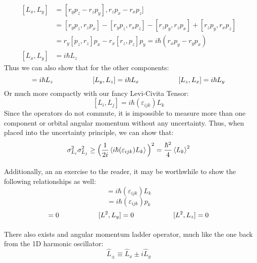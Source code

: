\documentclass[12pt,letterpaper]{book}
\begin{document}
\begin{equation}
\begin{split}
[L_x,L_y] &= [r_y p_z - r_z p_y], r_z p_x - r_x p_z] \\
			&= 	[r_y p_z,r_z p_x] - [r_y p_z, r_x p_z] - [r_z p_y,r_z p_x] + [r_z p_y,r_x p_z] \\
			&= 	r_y[p_z,r_z]p_x - r_x[r_z,p_z]p_y = i\hbar (r_x p_y - r_y p_x) \\
[L_x,L_y] &= i\hbar L_z	
\end{split}
\end{equation}
Thus we can also show that for the other components:
\begin{equation}
[L_x,L_y] = i\hbar L_z	\text{\hspace{2cm}}
[L_y,L_z] = i\hbar L_x	\text{\hspace{2cm}}
[L_z,L_x] = i\hbar L_y	
\end{equation}
Or much more compactly with our fancy Levi-Civita Tensor:
\begin{equation}
\label{L comm}
[L_i,L_j] = i\hbar(\varepsilon_{ijk})L_k
\end{equation}
Since the operators do not commute, it is impossible to measure more than one component or orbital angular momentum without any uncertainty. Thus, when placed into the uncertainty principle, we can show that:
\begin{equation}
\sigma^2_{L_i} \sigma^2_{L_j} \geq \Big(\frac{1}{2i}\expval{i\hbar(\varepsilon_{ijk})L_k}\Big)^2 = \frac{\hbar^2}{4}\expval{L_k}^2
\end{equation}

\paragraph*{}Additionally, an an exercise to the reader, it may be worthwhile to show the following relationships as well:
\begin{equation}
[r_i,L_j] = i\hbar(\varepsilon_{ijk})L_k
\end{equation}
\begin{equation}
[p_i,L_j] = i\hbar(\varepsilon_{ijk})p_k
\end{equation}
\begin{equation}
[L^2,L_x] = 0 \text{\hspace{2cm}} 
[L^2,L_y] = 0 \text{\hspace{2cm}} 
[L^2,L_z] = 0
\end{equation}

\paragraph*{}There also exists and angular momentum ladder operator, much like the one back from the 1D harmonic oscillator:
\begin{equation}
\label{L ladder}
\hat{L}_{\pm} \equiv \hat{L}_x \pm i\hat{L}_y
\end{equation}
\end{document}
